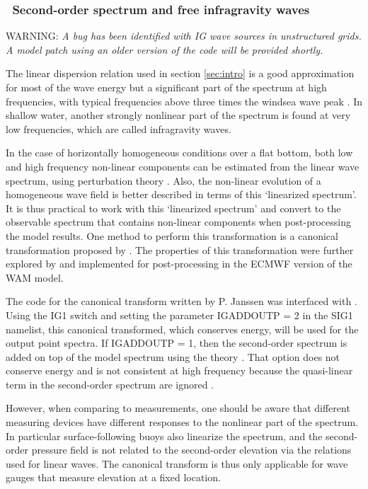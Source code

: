 \vsssub
\subsubsection{~Second-order spectrum and free infragravity waves} \label{sec:IG1}
\vsssub


\noindent 
WARNING: {\it A bug has been identified with IG wave sources in unstructured grids. 
A model patch using an older version of the code will be provided shortly.}

The linear dispersion relation used in section \ref{sec:intro} is a good
approximation for most of the wave energy but a significant part of the
spectrum at high frequencies, with typical frequencies above three times the
windsea wave peak \citep[e.g.][]{rep:Lec13}.  In shallow water, another
strongly nonlinear part of the spectrum is found at very low frequencies,
which are called infragravity waves.

In the case of horizontally homogeneous conditions over a flat bottom, both
low and high frequency non-linear components can be estimated from the linear
wave spectrum, using perturbation theory \citep[e.g.][]{art:Has62}. Also, the
non-linear evolution of a homogeneous wave field is better described in terms
of this `linearized spectrum'. It is thus practical to work with this
`linearized spectrum' and convert to the observable spectrum that contains
non-linear components when post-processing the model results. One method to
perform this transformation is a canonical transformation proposed by
\cite{art:Kra94}. The properties of this transformation were further explored
by \cite{art:Jan09} and implemented for post-processing in the ECMWF version
of the WAM model.

The code for the canonical transform written by P. Janssen was interfaced with
\ws.  Using the {\code IG1} switch and setting the parameter {\code IGADDOUTP
= 2} in the {\F SIG1} namelist, this canonical transformed, which conserves
energy, will be used for the output point spectra.  If {\code IGADDOUTP = 1},
then the second-order spectrum is added on top of the model spectrum using the
theory \citep[e.g.][]{art:Has62}. That option does not conserve energy and
is not consistent at high frequency because the quasi-linear term in the
second-order spectrum are ignored \citep{art:Jan09}.

However, when comparing to measurements, one should be aware that different
measuring devices have different responses to the nonlinear part of the
spectrum. In particular surface-following buoys also linearize the spectrum,
and the second-order pressure field is not related to the second-order
elevation via the relations used for linear waves. The canonical transform is
thus only applicable for wave gauges that measure elevation at a fixed
location.

